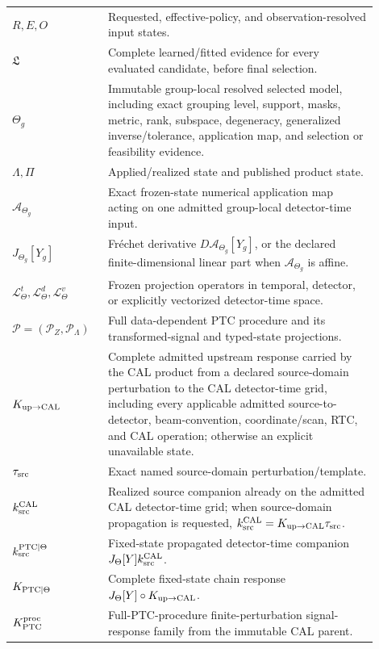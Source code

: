\begin{longtable}{>{\raggedright\arraybackslash}p{0.22\linewidth}
                  >{\raggedright\arraybackslash}p{0.68\linewidth}}
$R,E,O$ & Requested, effective-policy, and observation-resolved input states. \\
$\mathfrak L$ & Complete learned/fitted evidence for every evaluated candidate, before final selection. \\
$\Theta_g$ & Immutable group-local resolved selected model, including exact grouping level, support, masks, metric, rank, subspace, degeneracy, generalized inverse/tolerance, application map, and selection or feasibility evidence. \\
$\Lambda,\Pi$ & Applied/realized state and published product state. \\
$\mathcal A_{\Theta_g}$ & Exact frozen-state numerical application map acting on one admitted group-local detector-time input. \\
$J_{\Theta_g}[Y_g]$ & Fr\'echet derivative $D\mathcal A_{\Theta_g}[Y_g]$, or the declared finite-dimensional linear part when $\mathcal A_{\Theta_g}$ is affine. \\
$\mathcal L^{t}_{\Theta},\mathcal L^{d}_{\Theta},\mathcal L^{v}_{\Theta}$ & Frozen projection operators in temporal, detector, or explicitly vectorized detector-time space. \\
$\mathcal P=(\mathcal P_Z,\mathcal P_{\Lambda})$ & Full data-dependent PTC procedure and its transformed-signal and typed-state projections. \\
$K_{\rm up\to CAL}$ & Complete admitted upstream response carried by the CAL product from a declared source-domain perturbation to the CAL detector-time grid, including every applicable admitted source-to-detector, beam-convention, coordinate/scan, RTC, and CAL operation; otherwise an explicit unavailable state. \\
$\tau_{\rm src}$ & Exact named source-domain perturbation/template. \\
$k_{\rm src}^{\rm CAL}$ & Realized source companion already on the admitted CAL detector-time grid; when source-domain propagation is requested, $k_{\rm src}^{\rm CAL}=K_{\rm up\to CAL}\tau_{\rm src}$. \\
$k_{\rm src}^{\rm PTC\mid\Theta}$ & Fixed-state propagated detector-time companion $J_{\Theta}[Y]k_{\rm src}^{\rm CAL}$. \\
$K_{\rm PTC\mid\Theta}$ & Complete fixed-state chain response $J_{\Theta}[Y]\circ K_{\rm up\to CAL}$. \\
$K_{\rm PTC}^{\rm proc}$ & Full-PTC-procedure finite-perturbation signal-response family from the immutable CAL parent. \\

\end{longtable}
